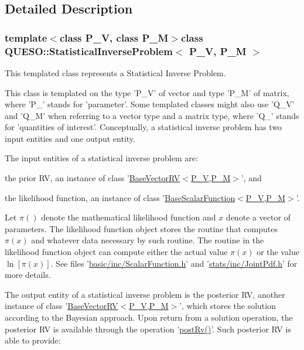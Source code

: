 \subsection{Detailed Description}
\subsubsection*{template$<$class P\-\_\-\-V, class P\-\_\-\-M$>$class Q\-U\-E\-S\-O\-::\-Statistical\-Inverse\-Problem$<$ P\-\_\-\-V, P\-\_\-\-M $>$}

This templated class represents a Statistical Inverse Problem. 

This class is templated on the type 'P\-\_\-\-V' of vector and type 'P\-\_\-\-M' of matrix, where 'P\-\_\-' stands for 'parameter'. Some templated classes might also use 'Q\-\_\-\-V' and 'Q\-\_\-\-M' when referring to a vector type and a matrix type, where 'Q\-\_\-' stands for 'quantities of interest'. Conceptually, a statistical inverse problem has two input entities and one output entity.\par
 The input entities of a statistical inverse problem are\-: 
\begin{DoxyEnumerate}
\item the prior R\-V, an instance of class '\hyperlink{class_q_u_e_s_o_1_1_base_vector_r_v}{Base\-Vector\-R\-V$<$\-P\-\_\-\-V,\-P\-\_\-\-M$>$}', and 
\item the likelihood function, an instance of class '\hyperlink{class_q_u_e_s_o_1_1_base_scalar_function}{Base\-Scalar\-Function$<$\-P\-\_\-\-V,\-P\-\_\-\-M$>$}'. 
\end{DoxyEnumerate}Let $ \pi()$ denote the mathematical likelihood function and $ x $ denote a vector of parameters. The likelihood function object stores the routine that computes $ \pi(x) $ and whatever data necessary by such routine. The routine in the likelihood function object can compute either the actual value $ \pi(x) $ or the value $ \ln[\pi(x)] $. See files '\hyperlink{_scalar_function_8h}{basic/inc/\-Scalar\-Function.\-h}' and '\hyperlink{_joint_pdf_8h}{stats/inc/\-Joint\-Pdf.\-h}' for more details.\par
 The output entity of a statistical inverse problem is the posterior R\-V, another instance of class '\hyperlink{class_q_u_e_s_o_1_1_base_vector_r_v}{Base\-Vector\-R\-V$<$\-P\-\_\-\-V,\-P\-\_\-\-M$>$}', which stores the solution according to the Bayesian approach. Upon return from a solution operation, the posterior R\-V is available through the operation '\hyperlink{class_q_u_e_s_o_1_1_statistical_inverse_problem_a69360a2f2ec5f33b33c5b5f61ec15344}{post\-Rv()}'. Such posterior R\-V is able to provide\-: 
